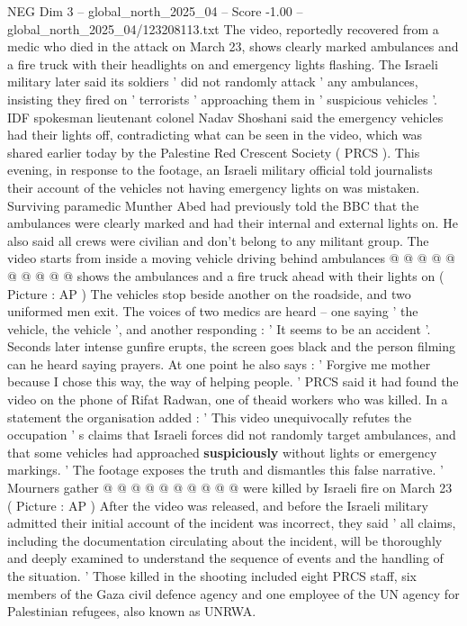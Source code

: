 \begin{textsample}{NEG Dim 3 – global\_north\_2025\_04 – Score -1.00 – global\_north\_2025\_04/123208113.txt}  \label{ex:f3_neg_403}
The video, reportedly recovered from a medic who died in the attack on March 23, shows clearly marked ambulances and a fire truck with their headlights on and emergency lights flashing.
The Israeli military later said its soldiers ' did not randomly attack ' any ambulances, insisting they fired on ' terrorists ' approaching them in ' suspicious vehicles '.
IDF spokesman lieutenant colonel Nadav Shoshani said the emergency vehicles had their lights off, contradicting what can be seen in the video, which was shared earlier today by the Palestine Red Crescent Society ( PRCS ).
This evening, in response to the footage, an Israeli military official told journalists their account of the vehicles not having emergency lights on was mistaken.
Surviving paramedic Munther Abed had previously told the BBC that the ambulances were clearly marked and had their internal and external lights on.
He also said all crews were civilian and don't belong to any militant group.
The video starts from inside a moving vehicle driving behind ambulances @ @ @ @ @ @ @ @ @ @ shows the ambulances and a fire truck ahead with their lights on ( Picture : AP ) The vehicles stop beside another on the roadside, and two uniformed men exit.
The voices of two medics are heard -- one saying ' the vehicle, the vehicle ', and another responding : ' It seems to be an accident '.
Seconds later intense gunfire erupts, the screen goes black and the person filming can he heard saying prayers.
At one point he also says : ' Forgive me mother because I chose this way, the way of helping people. ' PRCS said it had found the video on the phone of Rifat Radwan, one of theaid workers who was killed.
In a statement the organisation added : ' This video unequivocally refutes the occupation ' s claims that Israeli forces did not randomly target ambulances, and that some vehicles had approached \textbf{suspiciously} without lights or emergency markings. ' The footage exposes the truth and dismantles this false narrative. ' Mourners gather @ @ @ @ @ @ @ @ @ @ were killed by Israeli fire on March 23 ( Picture : AP ) After the video was released, and before the Israeli military admitted their initial account of the incident was incorrect, they said ' all claims, including the documentation circulating about the incident, will be thoroughly and deeply examined to understand the sequence of events and the handling of the situation. ' Those killed in the shooting included eight PRCS staff, six members of the Gaza civil defence agency and one employee of the UN agency for Palestinian refugees, also known as UNRWA.

\end{textsample}
